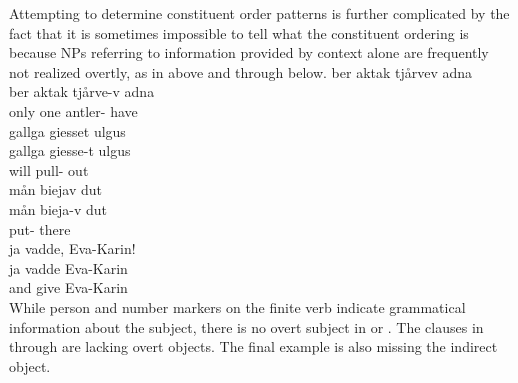 Attempting to determine constituent order patterns is further complicated by the fact that it is sometimes impossible to tell what the constituent ordering is because NPs referring to %
information provided by context alone are frequently not realized overtly, as in  above and  through  below.
\ea\label{missingNP1}
\glll	ber aktak tjårvev adna \\
	ber aktak tjårve-v adna \\
	only one antler- have\BS{}\\\nopagebreak
{} 
\z
\ea\label{missingNP2}%
\glll	gallga giesset ulgus\\
	gallga giesse-t ulgus\\
	will\BS{} pull- out\\\nopagebreak
{} 
\z
\ea\label{missingNP3}%
\glll	mån biejav dut\\
	mån bieja-v dut\\
	 put- there\\\nopagebreak
{} 
\z
\ea\label{missingNP4}%
\glll	ja vadde, Eva-Karin!\\
	ja vadde Eva-Karin\\
	and give\BS{} Eva-Karin\\\nopagebreak
{} 
\z
While person and number markers on the finite verb indicate grammatical information about the subject, there is no overt subject in  or . The clauses in  through  are lacking overt objects. The final example is also missing the indirect object.

